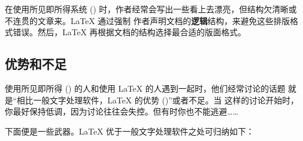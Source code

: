 在使用所见即所得系统 () 时，作者经常会写出一些看上去漂亮，但结构欠清晰或不连贯的文章来。\LaTeX{} 通过强制
作者声明文档的\textbf{逻辑}结构，来避免这些排版格式错误。然后，\LaTeX{} 再根据文档的结构选择最合适的版面格式。

\subsection{优势和不足}


使用所见即所得 () 的人和使用 \LaTeX{} 的人遇到一起时，他们经常讨论的话题
就是“相比一般文字处理软件，\LaTeX{} 的优势 ()”或者不足。当
这样的讨论开始时，你最好保持低调，因为讨论往往会失控。但有时你也不能逃避……


下面便是一些武器。\LaTeX{} 优于一般文字处理软件之处可归纳如下：

%
%

